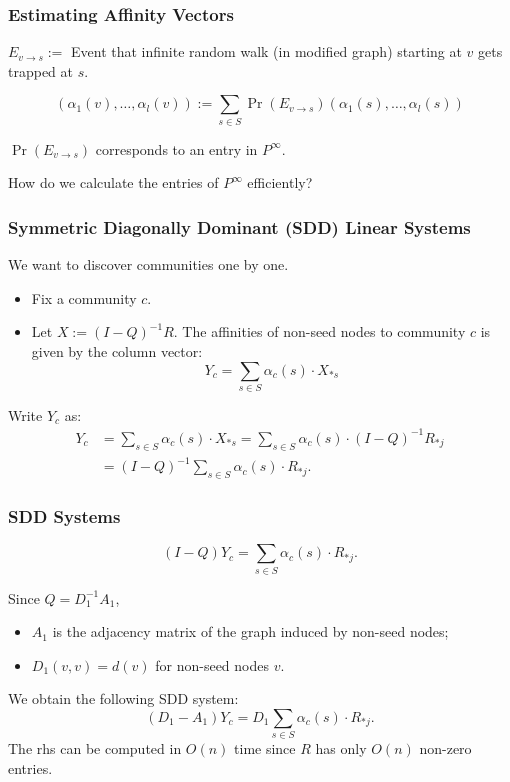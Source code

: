 \documentclass[xcolor=table]{beamer}
\begin{document}
\begin{frame}[t]
\frametitle{Estimating Affinity Vectors}
$E_{v \to s} := $ Event that infinite random walk (in modified graph) starting at $v$ gets trapped at $s$.

$$ (\alpha_1(v), \dots, \alpha_l(v)) := \sum_{s \in S} \Pr(E_{v \to s}) (\alpha_1(s), \dots, \alpha_l(s))$$

\medskip

$\Pr(E_{v \to s})$ corresponds to an entry in $P^\infty$.

\medskip

How do we calculate the entries of $P^\infty$ efficiently?
\end{frame}

\begin{frame}[t]
\frametitle{Symmetric Diagonally Dominant (SDD) Linear Systems}
We want to discover communities one by one. 
\begin{itemize}
	\item Fix a community $c$.
	\item Let $X := (I-Q)^{-1}R$. The affinities of non-seed nodes to 
	community $c$ is given by the column vector:
	\[
		Y_c = \sum_{s \in S} \alpha_c(s) \cdot X_{* s}
	\]
\end{itemize}

Write $Y_c$ as:
\begin{align*}
	Y_c & = \sum_{s \in S} \alpha_c(s) \cdot X_{* s} = \sum_{s \in S} \alpha_c(s) \cdot (I - Q)^{-1} R_{* j} \\
		& = (I - Q)^{-1} \sum_{s \in S} \alpha_c(s) \cdot R_{* j}. 
\end{align*}
\end{frame}

\begin{frame}[t]
\frametitle{SDD Systems}
\[
	(I - Q) Y_c = \sum_{s \in S} \alpha_c(s) \cdot R_{* j}.
\]

Since $Q = D_1^{-1} A_1$, 
\begin{itemize}
	\item $A_1$ is the adjacency matrix of the graph induced by non-seed nodes;
	\item $D_1(v, v) = d(v)$ for non-seed nodes $v$. 
\end{itemize}

We obtain the following SDD system:
\[
	(D_1 - A_1) Y_c = D_1 \sum_{s \in S} \alpha_c(s) \cdot R_{* j}.
\]
The rhs can be computed in $O(n)$ time since $R$ has only $O(n)$ non-zero entries. 

\medskip

\end{frame}
\end{document}
